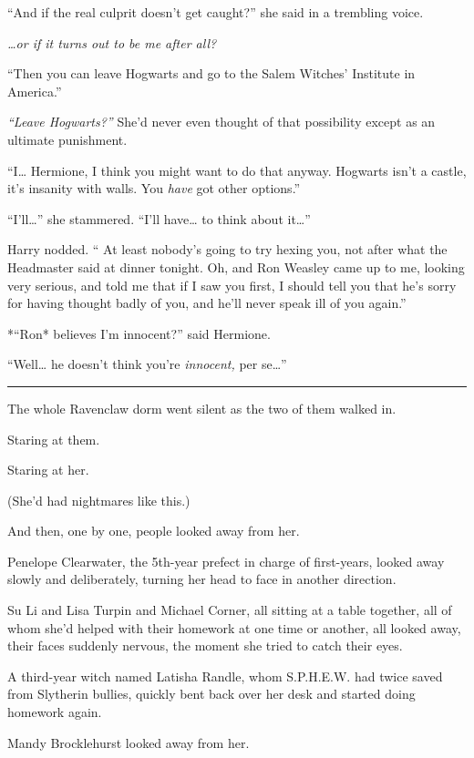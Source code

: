 ``And if the real culprit doesn't get caught?'' she said in a trembling
voice.

\emph{\ldots{}or if it turns out to be me after all?}

``Then you can leave Hogwarts and go to the Salem Witches' Institute in
America.''

\emph{``Leave Hogwarts?''} She'd never even thought of that possibility
except as an ultimate punishment.

``I\ldots{} Hermione, I think you might want to do that anyway. Hogwarts
isn't a castle, it's insanity with walls. You \emph{have} got other
options.''

``I'll\ldots{}'' she stammered. ``I'll have\ldots{} to think about
it\ldots{}''

Harry nodded. `` At least nobody's going to try hexing you, not after
what the Headmaster said at dinner tonight. Oh, and Ron Weasley came up
to me, looking very serious, and told me that if I saw you first, I
should tell you that he's sorry for having thought badly of you, and
he'll never speak ill of you again.''

*``Ron* believes I'm innocent?'' said Hermione.

``Well\ldots{} he doesn't think you're \emph{innocent,} per se\ldots{}''

\begin{center}\rule{3in}{0.4pt}\end{center}

The whole Ravenclaw dorm went silent as the two of them walked in.

Staring at them.

Staring at her.

(She'd had nightmares like this.)

And then, one by one, people looked away from her.

Penelope Clearwater, the 5th-year prefect in charge of first-years,
looked away slowly and deliberately, turning her head to face in another
direction.

Su Li and Lisa Turpin and Michael Corner, all sitting at a table
together, all of whom she'd helped with their homework at one time or
another, all looked away, their faces suddenly nervous, the moment she
tried to catch their eyes.

A third-year witch named Latisha Randle, whom S.P.H.E.W. had twice saved
from Slytherin bullies, quickly bent back over her desk and started
doing homework again.

Mandy Brocklehurst looked away from her.

